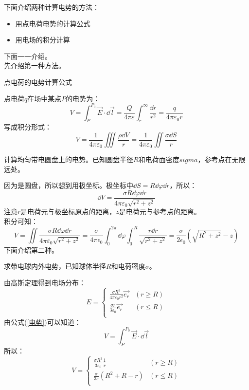 \documentclass[cn,hazy,blue,14pt,normal]{elegantnote}
\numberwithin{equation}{section}
\begin{document}
下面介绍两种计算电势的方法：
\begin{itemize}
    \item 用点电荷电势的计算公式
    \item 用电场的积分计算
\end{itemize}
下面一一介绍。\\
先介绍第一种方法。
\begin{theorem}
    点电荷的电势计算公式
\end{theorem}
点电荷$q$在场中某点$P$的电势为：
$$
V =\int_{P}^{P_0}\vec{E}\cdot\dd\vec{l} = \frac{Q}{4\pi\varepsilon}\int_{r}^{\infty}\frac{\dd r}{r^2} = \frac{q}{4\pi\varepsilon_0r}
$$
写成积分形式：
\begin{equation}\label{点电荷电势}
V = \frac{1}{4\pi\varepsilon_0}\iiint\frac{\rho\dd V}{r} = \frac{1}{4\pi\varepsilon_0}\iint\frac{\sigma\dd S}{r}
\end{equation}
\begin{example}
    计算均匀带电圆盘上的电势。已知圆盘半径$R$和电荷面密度$sigma$，参考点在无限远处。
\end{example}
因为是圆盘，所以想到用极坐标。极坐标中$\dd S = R\dd\varphi\dd r$，所以：
$$
\dd V = \frac{\sigma R\dd\varphi\dd r}{4\pi\varepsilon_0\sqrt{r^2+z^2}} 
$$
注意$r$是电荷元与极坐标原点的距离，$z$是电荷元与参考点的距离。\\
积分可知：
$$
V = \iint \frac{\sigma R\dd\varphi\dd r}{4\pi\varepsilon_0\sqrt{r^2+z^2}} 
= \frac{\sigma}{4\pi\epsilon_0}\int_{0}^{2\pi}\dd\varphi\int_{0}^{R}\frac{r\dd r}{\sqrt{r^2+z^2}} 
= \frac{\sigma}{2\epsilon_0}(\sqrt{R^2+z^2}-z)
$$
下面介绍第二种。
\begin{example}
    求带电球内外电势，已知球体半径$R$和电荷密度$\sigma$。
\end{example}
由高斯定理得到电场分布：
$$
E=
\left \{
    \begin{array}{ll}
        \frac{\sigma R^3}{4\pi\varepsilon_0r^2}\vec{e_r} &(r \geqslant R)\\
        \frac{\sigma r}{3\varepsilon_0}\vec{e_r} &(r \leqslant R)\\
    \end{array}
\right .
$$
由公式(\ref{电势})可以知道：
$$
V = \int_{P}^{P_0}\vec{E}\cdot\dd\vec{l}
$$
所以：
$$
V=
\left \{
    \begin{array}{ll}
        \frac{\sigma R^3}{3\varepsilon_0}\frac 1r & (r \geqslant R)\\
        \frac{\sigma}{3\varepsilon}(R^2+R-r) & (r \leqslant R)\\
    \end{array}
\right .
$$
\end{document}

